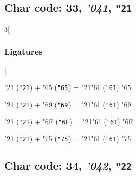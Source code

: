 \documentclass{article}
\newlength{\maxcharwidth}
\begin{document}

\subsection{Char code: 33, {\it'041}, {\tt"21}}
\label{char_33}


\begin{multicols}{3}[\subsubsection{Ligatures}]

{\testfont\char"21\noboundary} ({\tt"21}) + {\testfont\char"65\noboundary} ({\tt"65}) = {\testfont\char"21\noboundary}{\testfont\char"61\noboundary} ({\tt"61}) {\testfont\char"65\noboundary}

{\testfont\char"21\noboundary} ({\tt"21}) + {\testfont\char"69\noboundary} ({\tt"69}) = {\testfont\char"21\noboundary}{\testfont\char"61\noboundary} ({\tt"61}) {\testfont\char"69\noboundary}

{\testfont\char"21\noboundary} ({\tt"21}) + {\testfont\char"6F\noboundary} ({\tt"6F}) = {\testfont\char"21\noboundary}{\testfont\char"61\noboundary} ({\tt"61}) {\testfont\char"6F\noboundary}

{\testfont\char"21\noboundary} ({\tt"21}) + {\testfont\char"75\noboundary} ({\tt"75}) = {\testfont\char"21\noboundary}{\testfont\char"61\noboundary} ({\tt"61}) {\testfont\char"75\noboundary}

\end{multicols}

\subsection{Char code: 34, {\it'042}, {\tt"22}}
\label{char_34}
\end{document}
